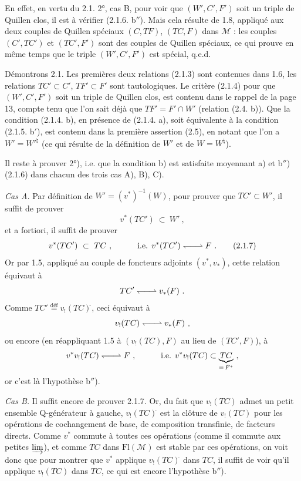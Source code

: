 \documentclass[11pt]{article}
\newcommand{\printedpage}[1]{\marginpar{\footnotesize p.~#1}}
\newcommand{\msp}[1]{\marginpar{\footnotesize [#1]}}
\newcommand{\M}{\mathcal{M}}
\newcommand{\Fl}{\mathrm{Fl}}
\newcommand{\harp}{\mathrel{\leftharpoondown\joinrel\relbar\joinrel\rightharpoonup}}
\begin{document}
\printedpage{11}

\msp{page 17}
En effet, en vertu du 2.1. 2°, cas B, pour voir que $(W',C',F')$ soit un triple de Quillen clos, il est à vérifier (2.1.6. b$''$). Mais cela résulte de 1.8, appliqué aux deux couples de Quillen spéciaux $(C,TF)$, $(TC,F)$ dans $\M$ : les couples $(C',TC')$ et $(TC',F')$ sont des couples de Quillen spéciaux, ce qui prouve en même temps que le triple $(W',C',F')$ est spécial, q.e.d. %

Démontrons 2.1. Les premières deux relations (2.1.3) sont contenues dans 1.6, les relations $TC' \subset C'$, $TF' \subset F'$ sont tautologiques. Le critère (2.1.4) pour que $(W',C',F')$ soit un triple de Quillen clos, est contenu dans le rappel de la page 13, compte tenu que l'on sait déjà que $TF' = F' \cap W'$ (relation (2.4. b)). Que la condition (2.1.4. b), en présence de (2.1.4. a), soit équivalente à la condition (2.1.5. b$'$), est contenu dans la première assertion (2.5), en notant que l'on a $W' = W'^{\natural}$ (ce qui résulte de la définition de $W'$ et de $W = W^{\natural}$).

Il reste à prouver 2°), i.e. que la condition b) est satisfaite moyennant a) et b$''$) (2.1.6) dans chacun des trois cas A), B), C).

\textit{Cas A.} Par définition de $W' = (v^*)^{-1}(W)$, pour prouver que $TC' \subset W'$, il suffit de prouver
\[
v^*(TC')\ \subset\ W'\ ,  %
\]
et a fortiori, il suffit de prouver
\[
v^*(TC')\ \subset\ TC\ ,\qquad\quad \text{i.e. } v^*(TC') \harp F\ .
\tag*{(2.1.7)} %
\]
Or par 1.5, appliqué au couple de foncteurs
\msp{page 18}
adjoints $(v^*,v_*)$, cette relation équivaut à
\[
TC' \harp v_*(F)\ .
\]
Comme $TC' \overset{\text{déf}}{=} v_!(TC)^{\breve{}}$, ceci équivaut à
\[
v_!(TC) \harp v_*(F)\ ,
\]
ou encore (en réappliquant 1.5 à $(v_!(TC),F)$ au lieu de $(TC',F)$), à
\[
v^*v_!(TC) \harp F\ ,\qquad\quad \text{i.e. } v^*v_!(TC) \subset \underbrace{TC}_{=\,F^*}\ ,
\]
or c'est là l'hypothèse b$''$).

\textit{Cas B.} Il suffit encore de prouver 2.1.7. Or, du fait que $v_!(TC)$ admet un petit ensemble Q-générateur à gauche, $v_!(TC)^{\breve{}}$ est la clôture de $v_!(TC)$ pour les opérations de cochangement de base, de composition transfinie, de facteurs directs. Comme $v^*$ commute à toutes ces opérations (comme il commute aux petites $\varinjlim$), et comme $TC$ dans $\Fl(\M)$ est stable par ces opérations, on voit donc que pour montrer que $v^*$ applique $v_!(TC)^{\breve{}}$ dans $TC$, il suffit de voir qu'il applique $v_!(TC)$ dans $TC$, ce qui est encore l'hypothèse b$''$).
\end{document}
